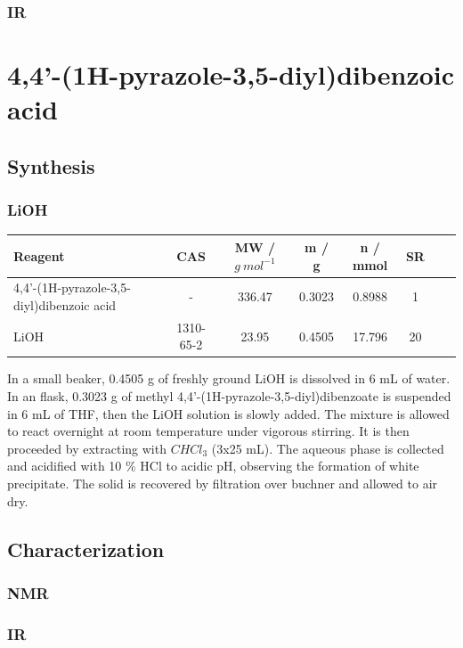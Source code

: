 \documentclass[../Master.tex]{subfiles}
\begin{document}
\subsubsection{IR}

\section{4,4'-(1H-pyrazole-3,5-diyl)dibenzoic acid}
\subsection{Synthesis}
\subsubsection{LiOH}
\begin{center}
	\begin{tabular}[b]{lccccccc}
		\toprule
		Reagent                                   & CAS       & MW / \(g \ mol^{-1}\) & m / g  & n / mmol & SR \\
		\midrule
		4,4'-(1H-pyrazole-3,5-diyl)dibenzoic acid & -         & 336.47                & 0.3023 & 0.8988   & 1  \\
		LiOH                                      & 1310-65-2 & 23.95                 & 0.4505 & 17.796   & 20 \\
		\bottomrule
	\end{tabular}
\end{center}

In a small beaker, 0.4505 g of freshly ground LiOH is dissolved in 6 mL of water. In an flask, 0.3023 g of methyl 4,4'-(1H-pyrazole-3,5-diyl)dibenzoate is suspended in 6 mL of THF, then the LiOH solution is slowly added. The mixture is allowed to react overnight at room temperature under vigorous stirring. It is then proceeded by extracting with \(CHCl_{3}\) (3x25 mL). The aqueous phase is collected and acidified with 10 \% HCl to acidic pH, observing the formation of white precipitate. The solid is recovered by filtration over buchner and allowed to air dry.

\subsection{Characterization}
\subsubsection{NMR}
\subsubsection{IR}
\end{document}
